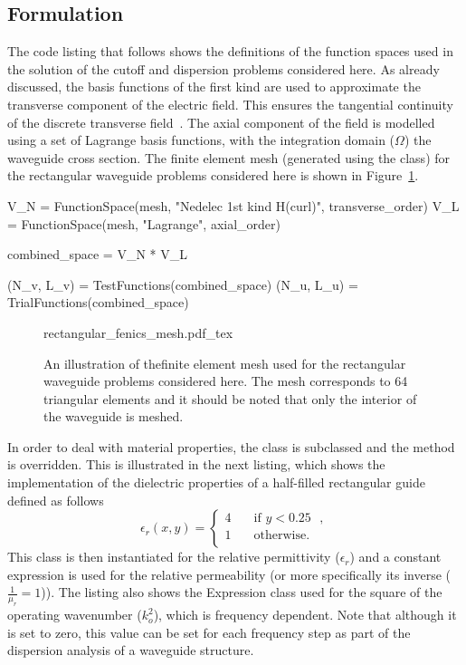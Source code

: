 \subsection{Formulation}

The code listing that follows shows the definitions of the function
spaces used in the solution of the cutoff and dispersion problems
considered here. As already discussed, the \nedelec{} basis functions of
the first kind are used to approximate the transverse component of the
electric field. This ensures the tangential continuity of the discrete
transverse field~\citep{Jin2002}.  The axial component of the field is
modelled using a set of Lagrange basis functions, with the integration
domain ($\Omega$) the waveguide cross section. The finite element mesh
(generated using the \dolfin{}  class) for the
rectangular waveguide problems considered here is shown in
Figure~\ref{fig:lezar:rectangular_fenics_mesh}.
\begin{python}
V_N = FunctionSpace(mesh, "Nedelec 1st kind H(curl)", transverse_order)
V_L = FunctionSpace(mesh, "Lagrange", axial_order)

combined_space = V_N * V_L

(N_v, L_v) = TestFunctions(combined_space)
(N_u, L_u) = TrialFunctions(combined_space)
\end{python}

\begin{figure}
  \centering
    \def\svgwidth{\smallfig}
  {rectangular_fenics_mesh.pdf_tex}
  \caption{An illustration of the\break finite element mesh used for the
  rectangular waveguide problems considered here. The mesh corresponds
  to 64 triangular elements and it should be noted that only the interior
  of the waveguide is meshed.}
  \label{fig:lezar:rectangular_fenics_mesh}
\end{figure}

In order to deal with material properties, the  class
is subclassed and the  method is overridden. This is illustrated
in the next listing, which shows the implementation of the dielectric
properties of a half-filled rectangular guide defined as follows
\begin{equation}
\label{eq:lezar:half_filled_dielectric}
\epsilon_r (x,y) =
\begin{cases}
  4\quad &\text{if $y < 0.25$ },\\
  1\quad &\text{otherwise}.\\
\end{cases}
\end{equation}
This class is then instantiated for the relative permittivity
($\epsilon_r$) and a constant expression is used for the relative
permeability (or more specifically its inverse ($\frac{1}{\mu_r}
= 1$)). The listing also shows the Expression class used for the
square of the operating wavenumber ($k_o^2$), which is frequency
dependent. Note that although it is set to zero, this value can
be set for each frequency step as part of the dispersion analysis of a
waveguide structure.

